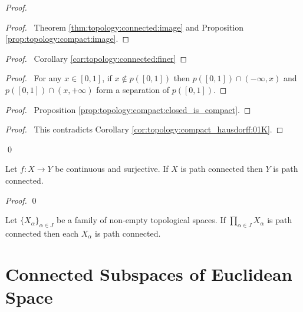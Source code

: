 \begin{proof}
\pf
{}
 \begin{proof}
   \pf\ Theorem \ref{thm:topology:connected:image} and Proposition
\ref{prop:topology:compact:image}.
\end{proof}
 \begin{proof}
   \pf\ Corollary \ref{cor:topology:connected:finer}
 \end{proof}

 \begin{proof}
   \pf\ For any $x \in [0,1]$, if $x \notin p([0,1])$ then $p([0,1]) \cap
(-\infty, x)$ and $p([0,1]) \cap (x, + \infty)$ form a separation of $p([0,1])$.
\end{proof}
 \begin{proof}
   \pf\ Proposition \ref{prop:topology:compact:closed_is_compact}.
 \end{proof}
 \qedstep
 \begin{proof}
   \pf\ This contradicts Corollary \ref{cor:topology:compact_hausdorff:01K}.
 \end{proof}
 \qed
\end{proof}

\begin{prop}
Let $f : X \rightarrow Y$ be continuous and surjective. If $X$ is path
connected then $Y$ is path connected.
\end{prop}

\begin{proof}
\pf
{}
\qed
\end{proof}

\begin{cor}
Let $\{ X_\alpha \}_{\alpha \in J}$ be a family of non-empty topological
spaces. If $\prod_{\alpha \in J} X_\alpha$ is path connected then each
$X_\alpha$ is path connected.
\end{cor}

\section{Connected Subspaces of Euclidean Space}

